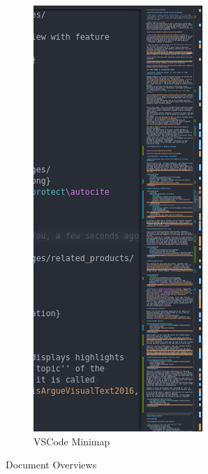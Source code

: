 \documentclass{l4proj}
\begin{document}
\begin{figure}
    \begin{subfigure}[c]{0.17\textwidth}
        \centering
        \small
        \includegraphics[width=\linewidth]{images/related_products/vscode_minimap.png}
        \caption{VSCode Minimap}
        \label{fig:vscode_minimap}
    \end{subfigure}
    \caption{Document Overviews}
    \vspace{-40pt}
    \label{fig:test-modes}
\end{figure}
\end{document}
